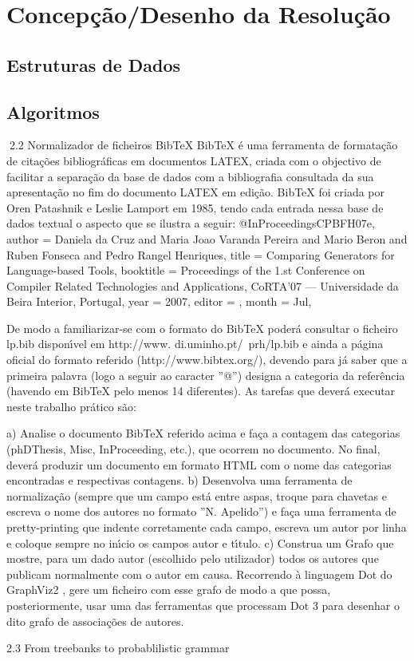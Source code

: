 \chapter{Concepção/Desenho da Resolução}
\section{Estruturas de Dados}
\section{Algoritmos}

2.2    Normalizador de ficheiros BibTeX
BibTeX é uma ferramenta de formatação de citações bibliográficas em documentos LATEX, criada com o objectivo de
facilitar a separação da base de dados com a bibliografia consultada da sua apresentação no fim do documento LATEX
em edição. BibTeX foi criada por Oren Patashnik e Leslie Lamport em 1985, tendo cada entrada nessa base de dados
textual o aspecto que se ilustra a seguir:
@InProceedings{CPBFH07e,
  author =    {Daniela da Cruz and Maria Joao Varanda Pereira
               and Mario Beron and Ruben Fonseca and
               Pedro Rangel Henriques},
  title =     {Comparing Generators for Language-based Tools},
  booktitle = {Proceedings of the 1.st Conference on Compiler
               Related Technologies and Applications, CoRTA’07
               --- Universidade da Beira Interior, Portugal},
  year =      {2007},
  editor =    {},
  month =     {Jul},
}

De modo a familiarizar-se com o formato do BibTeX poderá consultar o ficheiro lp.bib disponı́vel em http://www.
di.uminho.pt/~prh/lp.bib e ainda a página oficial do formato referido (http://www.bibtex.org/), devendo para
já saber que a primeira palavra (logo a seguir ao caracter ”@”) designa a categoria da referência (havendo em BibTeX
pelo menos 14 diferentes).
As tarefas que deverá executar neste trabalho prático são:

a) Analise o documento BibTeX referido acima e faça a contagem das categorias (phDThesis, Misc, InProceeding,
    etc.), que ocorrem no documento. No final, deverá produzir um documento em formato HTML com o nome das
    categorias encontradas e respectivas contagens.
b) Desenvolva uma ferramenta de normalização (sempre que um campo está entre aspas, troque para chavetas e
    escreva o nome dos autores no formato ”N. Apelido”) e faça uma ferramenta de pretty-printing que indente
    corretamente cada campo, escreva um autor por linha e coloque sempre no inı́cio os campos autor e tı́tulo.
c) Construa um Grafo que mostre, para um dado autor (escolhido pelo utilizador) todos os autores que publicam
     normalmente com o autor em causa.
     Recorrendo à linguagem Dot do GraphViz2 , gere um ficheiro com esse grafo de modo a que possa, posteriormente,
     usar uma das ferramentas que processam Dot 3 para desenhar o dito grafo de associações de autores.

2.3    From treebanks to probablilistic grammar
